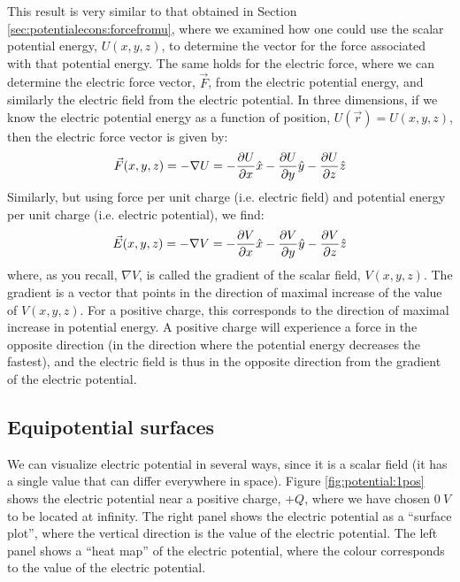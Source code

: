 This result is very similar to that obtained in Section \ref{sec:potentialecons:forcefromu}, where we examined how one could use the scalar potential energy, $U(x,y,z)$, to determine the vector for the force associated with that potential energy. The same holds for the electric force, where we can determine the electric force vector, $\vec F$, from the electric potential energy, and similarly the electric field from the electric potential. In three dimensions, if we know the electric potential energy as a function of position, $U(\vec r)=U(x,y,z)$, then the electric force vector is given by:
\begin{align*}
\vec F(x,y,z) =- \nabla U=-\frac{\partial U}{\partial x}\hat x-\frac{\partial U}{\partial y}\hat y-\frac{\partial U}{\partial z}\hat z
\end{align*}
Similarly, but using force per unit charge (i.e. electric field) and potential energy per unit charge (i.e. electric potential), we find:
\begin{align*}
\vec E(x,y,z) = -\nabla V =-\frac{\partial V}{\partial x}\hat x-\frac{\partial V}{\partial y}\hat y-\frac{\partial V}{\partial z}\hat z
\end{align*}
where, as you recall, $\nabla V$, is called the gradient of the scalar field, $V(x,y,z)$. The gradient is a vector that points in the direction of maximal increase of the value of $V(x,y,z)$. For a positive charge, this corresponds to the direction of maximal increase in potential energy. A positive charge will experience a force in the opposite direction (in the direction where the potential energy decreases the fastest), and the electric field is thus in the opposite direction from the gradient of the electric potential.

\subsection{Equipotential surfaces}
We can visualize electric potential in several ways, since it is a scalar field (it has a single value that can differ everywhere in space). Figure \ref{fig:potential:1pos} shows the electric potential near a positive charge, $+Q$, where we have chosen $\SI{0}{V}$ to be located at infinity. The right panel shows the electric potential as a ``surface plot'', where the vertical direction is the value of the electric potential. The left panel shows a ``heat map'' of the electric potential, where the colour corresponds to the value of the electric potential.


